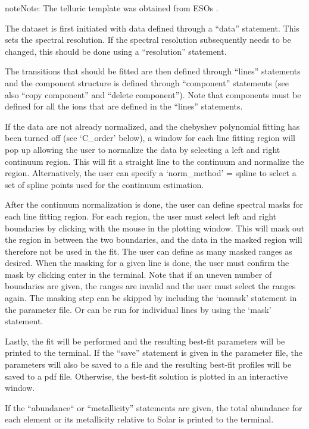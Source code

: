 \documentclass[letterpaper,10pt,english]{sphinxmanual}
\begin{document}
\begin{sphinxadmonition}{note}{Note:}
The telluric template was obtained from ESOs .

The dataset is first initiated with data defined through a “data” statement. This sets the spectral resolution. If the spectral resolution subsequently needs to be changed, this should be done using a “resolution” statement.

The transitions that should be fitted are then defined through “lines” statements and the component structure is defined through “component” statements (see also “copy component” and “delete component”). Note that components must be defined for all the ions that are defined in the “lines” statements.

If the data are not already normalized, and the chebyshev polynomial fitting has been turned off (see ‘C\_order’ below), a window for each line fitting region will pop up allowing the user to normalize the data by selecting a left and right continuum region. This will fit a straight line to the continuum and normalize the region. Alternatively, the user can specify a ‘norm\_method’ = spline to select a set of spline points used for the continuum estimation.

After the continuum normalization is done, the user can define spectral masks for each line fitting region. For each region, the user must select left and right boundaries by clicking with the mouse in the plotting window. This will mask out the region in between the two boundaries, and the data in the masked region will therefore not be used in the fit. The user can define as many masked ranges as desired. When the masking for a given line is done, the user must confirm the mask by clicking enter in the terminal. Note that if an uneven number of boundaries are given, the ranges are invalid and the user must select the ranges again.
The masking step can be skipped by including the ‘nomask’ statement in the parameter file. Or can be run for individual lines by using the ‘mask’ statement.

Lastly, the fit will be performed and the resulting best-fit parameters will be printed to the terminal. If the “save” statement is given in the parameter file, the parameters will also be saved to a file and the resulting best-fit profiles will be saved to a pdf file. Otherwise, the best-fit solution is plotted in an interactive window.

If the “abundance“ or “metallicity” statements are given, the total abundance for each element or its metallicity relative to Solar is printed to the terminal.
\end{sphinxadmonition}
\end{document}
